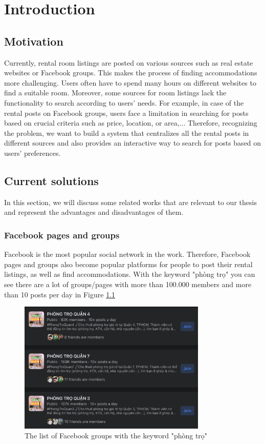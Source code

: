 \chapter{Introduction}

\section{Motivation}
Currently, rental room listings are posted on various sources such as real estate websites or Facebook groups. This makes the process of finding accommodations more challenging. Users often have to spend many hours on different websites to find a suitable room. Moreover, some sources for room listings lack the functionality to search according to users' needs. For example, in case of the rental posts on Facebook groups, users face a limitation in searching for posts based on crucial criteria such as price, location, or area,... Therefore, recognizing the problem, we want to build a system that centralizes all the rental posts in different sources and also provides an interactive way to search for posts based on users' preferences.

\section{Current solutions}
In this section, we will discuss some related works that are relevant to our thesis and represent the advantages and disadvantages of them.

\subsection{Facebook pages and groups}
Facebook is the most popular social network in the work. Therefore, Facebook pages and groups also become popular platforms for people to post their rental listings, as well as find accommodations. With the keyword "phòng trọ" you can see there are a lot of groups/pages with more than 100.000 members and more than 10 posts per day in Figure \ref{fig:facebook-group}

\begin{figure}[ht]
    \centering
    \includegraphics[width=0.8\textwidth]{images/1.Introduction/facebook_groups.png}
    \caption{The list of Facebook groups with the keyword "phòng trọ"}
    \label{fig:facebook-group}
\end{figure}

